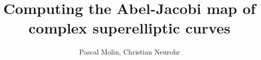 \documentclass[11pt,a4paper]{article}
\title{Computing the Abel-Jacobi map of complex superelliptic curves}
\author{Pascal Molin, Christian Neurohr}
\def\biblio{}
\begin{document}
\def\biblio{}

\maketitle

\tableofcontents
\newpage



















\newpage


\end{document}
